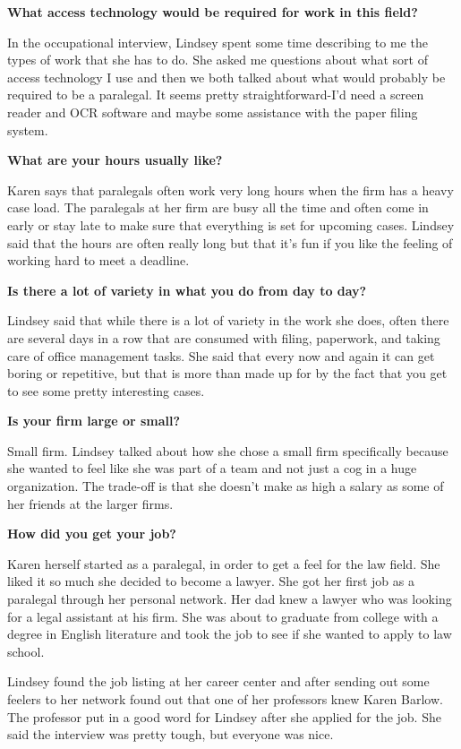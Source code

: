 \textbf{What access technology would be required for work in this field?} 

In the occupational interview, Lindsey spent some time describing to me the types of work that she has to do. She asked me questions about what sort of access technology I use and then we both talked about what would probably be required to be a paralegal. It seems pretty straightforward-I'd need a screen reader and OCR software and maybe some assistance with the paper filing system.

\textbf{What are your hours usually like?} 

Karen says that paralegals often work very long hours when the firm has a heavy case load. The paralegals at her firm are busy all the time and often come in early or stay late to make sure that everything is set for upcoming cases. Lindsey said that the hours are often really long but that it's fun if you like the feeling of working hard to meet a deadline.

\textbf{Is there a lot of variety in what you do from day to day? }

Lindsey said that while there is a lot of variety in the work she does, often there are several days in a row that are consumed with filing, paperwork, and taking care of office management tasks. She said that every now and again it can get boring or repetitive, but that is more than made up for by the fact that you get to see some pretty interesting cases.

\textbf{Is your firm large or small?} 

Small firm. Lindsey talked about how she chose a small firm specifically because she wanted to feel like she was part of a team and not just a cog in a huge organization. The trade-off is that she doesn't make as high a salary as some of her friends at the larger firms.

\textbf{How did you get your job?} 

Karen herself started as a paralegal, in order to get a feel for the law field. She liked it so much she decided to become a lawyer. She got her first job as a paralegal through her personal network. Her dad knew a lawyer who was looking for a legal assistant at his firm. She was about to graduate from college with a degree in English literature and took the job to see if she wanted to apply to law school.

Lindsey found the job listing at her career center and after sending out some feelers to her network found out that one of her professors knew Karen Barlow. The professor put in a good word for Lindsey after she applied for the job. She said the interview was pretty tough, but everyone was nice.

